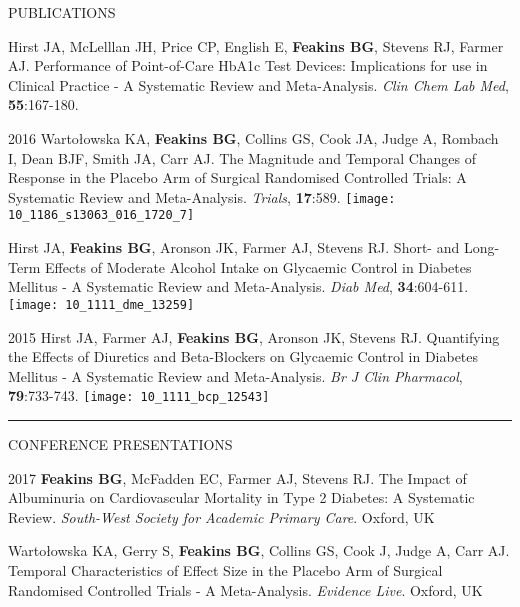 \documentclass[10pt,a4paper]{article}
\begin{document}
\begin{cvlist}{PUBLICATIONS}
  \item[]
  Hirst JA, McLelllan JH, Price CP, English E, \textbf{Feakins BG}, Stevens RJ, Farmer AJ. Performance of Point-of-Care HbA1c Test Devices: Implications for use in Clinical Practice - A Systematic Review and Meta-Analysis. \textit{Clin Chem Lab Med}, \textbf{55}:167-180. 
  
  \item[2016]
  Warto\l{}owska KA, \textbf{Feakins BG}, Collins GS, Cook JA, Judge A, Rombach I, Dean BJF, Smith JA, Carr AJ. The Magnitude and Temporal Changes of Response in the Placebo Arm of Surgical Randomised Controlled Trials: A Systematic Review and Meta-Analysis. \textit{Trials}, \textbf{17}:589.  \texttt{[image: 10\_1186\_s13063\_016\_1720\_7]}
  
  \item[]
  Hirst JA, \textbf{Feakins BG}, Aronson JK, Farmer AJ, Stevens RJ. Short- and Long-Term Effects of Moderate Alcohol Intake on Glycaemic Control in Diabetes Mellitus - A Systematic Review and Meta-Analysis. \textit{Diab Med}, \textbf{34}:604-611.  \texttt{[image: 10\_1111\_dme\_13259]}
  
  \item[2015]
  Hirst JA, Farmer AJ, \textbf{Feakins BG}, Aronson JK, Stevens RJ. Quantifying the Effects of Diuretics and Beta-Blockers on Glycaemic Control in Diabetes Mellitus - A Systematic Review and Meta-Analysis. \textit{Br J Clin Pharmacol}, \textbf{79}:733-743.  \texttt{[image: 10\_1111\_bcp\_12543]}
  
\end{cvlist}


\noindent\rule{\textwidth}{0.4pt}
\begin{cvlist}{CONFERENCE PRESENTATIONS}
  
  \item[2017]
  \textbf{Feakins BG}, McFadden EC, Farmer AJ, Stevens RJ. The Impact of Albuminuria on Cardiovascular Mortality in Type 2 Diabetes: A Systematic Review. \textit{South-West Society for Academic Primary Care}. Oxford, UK
  
  \item[]
  Warto\l{}owska KA, Gerry S, \textbf{Feakins BG}, Collins GS, Cook J, Judge A, Carr AJ. Temporal Characteristics of Effect Size in the Placebo Arm of Surgical Randomised Controlled Trials - A Meta-Analysis. \textit{Evidence Live}. Oxford, UK
  
\end{cvlist}
\end{document}
